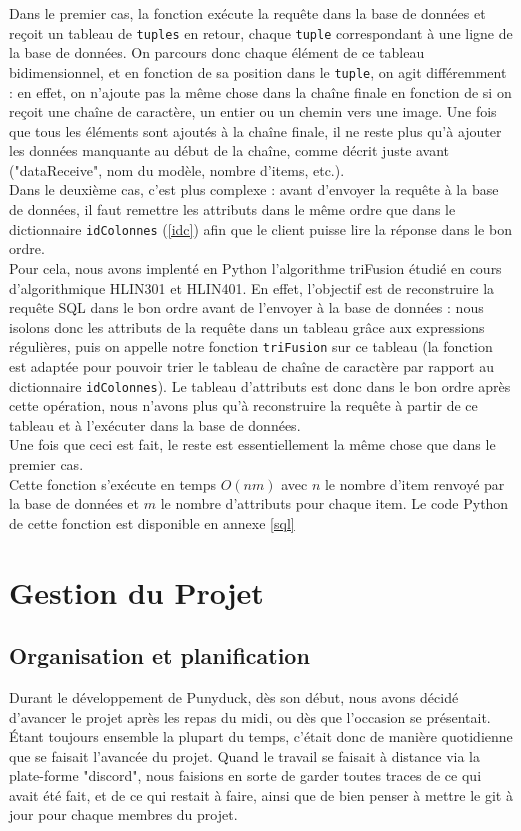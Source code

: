 \documentclass{report}
\begin{document}
Dans le premier cas, la fonction exécute la requête dans la base de données et reçoit un tableau de \verb!tuples! en retour, chaque \verb!tuple! correspondant à une ligne de la base de données. On parcours donc chaque élément de ce tableau bidimensionnel, et en fonction de sa position dans le \verb!tuple!, on agit différemment : en effet, on n'ajoute pas la même chose dans la chaîne finale en fonction de si on reçoit une chaîne de caractère, un entier ou un chemin vers une image. Une fois que tous les éléments sont ajoutés à la chaîne finale, il ne reste plus qu'à ajouter les données manquante au début de la chaîne, comme décrit juste avant ("dataReceive", nom du modèle, nombre d'items, etc.). \\

Dans le deuxième cas, c'est plus complexe : avant d'envoyer la requête à la base de données, il faut remettre les attributs dans le même ordre que dans le dictionnaire \verb!idColonnes! (\ref{idc}) afin que le client puisse lire la réponse dans le bon ordre. \\
Pour cela, nous avons implenté en Python l'algorithme triFusion étudié en cours d'algorithmique HLIN301 et HLIN401. En effet, l'objectif est de reconstruire la requête SQL dans le bon ordre avant de l'envoyer à la base de données : nous isolons donc les attributs de la requête dans un tableau grâce aux expressions régulières, puis on appelle notre fonction \verb!triFusion! sur ce tableau (la fonction est adaptée pour pouvoir trier le tableau de chaîne de caractère par rapport au dictionnaire \verb!idColonnes!). Le tableau d'attributs est donc dans le bon ordre après cette opération, nous n'avons plus qu'à reconstruire la requête à partir de ce tableau et à l'exécuter dans la base de données. \\
Une fois que ceci est fait, le reste est essentiellement la même chose que dans le premier cas. \\

Cette fonction s'exécute en temps $O(nm)$ avec $n$ le nombre d'item renvoyé par la base de données et $m$ le nombre d'attributs pour chaque item. Le code Python de cette fonction est disponible en annexe \ref{sql}

\chapter{Gestion du Projet}
\section{Organisation et planification}
Durant le développement de Punyduck, dès son début, nous avons décidé d'avancer le projet après les repas du midi,
ou dès que l'occasion se présentait. Étant toujours ensemble la plupart du temps, c'était donc de manière quotidienne que se faisait l'avancée du projet. Quand le travail se faisait à distance via la plate-forme "discord", nous faisions en sorte de garder toutes traces de ce qui avait été fait, et de ce qui restait à faire, ainsi que de bien penser à mettre le git à jour pour chaque membres du projet.\\
\end{document}
